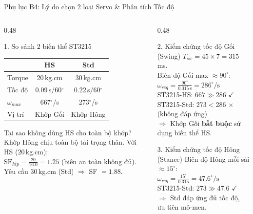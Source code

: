 \documentclass[10pt,aspectratio=169]{beamer}
\begin{document}
\begin{frame}{Phụ lục B4: Lý do chọn 2 loại Servo \& Phân tích Tốc độ}
  \small
  \begin{columns}[t]
      \begin{column}{0.48\textwidth}
          \begin{block}{1. So sánh 2 biến thể ST3215}
              \def\arraystretch{1.1}
              \centering
              \begin{tabular}{l c c}
                  \toprule
                  & \textbf{HS} & \textbf{Std} \\
                  \midrule
                  Torque & 20\,kg.cm & 30\,kg.cm \\
                  Tốc độ & 0.09\,s/60$^\circ$ & 0.22\,s/60$^\circ$ \\
                  $\omega_{max}$ & 667$^\circ$/s & 273$^\circ$/s \\
                  Vị trí & Khớp Gối & Khớp Hông \\
                  \bottomrule
              \end{tabular}
          \end{block}
          \begin{alertblock}{Tại sao không dùng HS cho toàn bộ khớp?}
              {\footnotesize Khớp Hông chịu toàn bộ tải trọng thân. Với HS ($20\,$kg.cm):\\
              $\text{SF}_{hip} = \frac{20}{16.0} = 1.25$ (biên an toàn không đủ).\\
              Yêu cầu $30\,$kg.cm (Std) $\Rightarrow$ SF $= 1.88$.}
          \end{alertblock}
      \end{column}
      \begin{column}{0.48\textwidth}
          \begin{block}{2. Kiểm chứng tốc độ Gối (Swing)}
              $T_{sw} = 45 \times 7 = 315\,$ms.\\
              Biên độ Gối max $\approx 90^\circ$:\\
              $\omega_{req} = \frac{90^\circ}{0.315\,\text{s}} = 286^\circ/\text{s}$\\[0.1cm]
              ST3215-HS: $667 \gg 286$ $\checkmark$\\
              ST3215-Std: $273 < 286$ $\times$ {\footnotesize (không đáp ứng)}\\
              $\Rightarrow$ Khớp Gối \textbf{bắt buộc} sử dụng biến thể HS.
          \end{block}
          \begin{block}{3. Kiểm chứng tốc độ Hông (Stance)}
              Biên độ Hông mỗi sải $\approx 15^\circ$:\\
              $\omega_{req} = \frac{15^\circ}{0.315} = 47.6^\circ/\text{s}$\\
              ST3215-Std: $273 \gg 47.6$ $\checkmark$\\
              $\Rightarrow$ Std đáp ứng đủ tốc độ, ưu tiên mô-men.
          \end{block}
      \end{column}
  \end{columns}
\end{frame}
\end{document}
